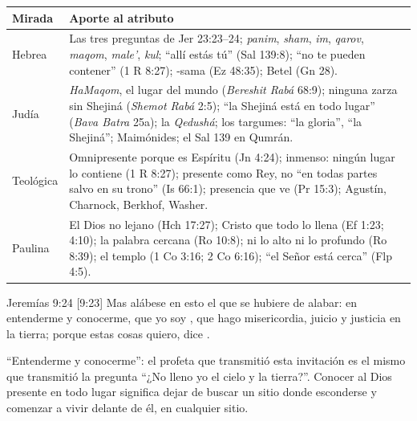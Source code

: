 \begin{center}\small\renewcommand{\arraystretch}{1.3}
\begin{tabular}{@{}L{3.0cm}L{11.4cm}@{}}
\toprule
\textbf{Mirada} & \textbf{Aporte al atributo} \\ \midrule
Hebrea & Las tres preguntas de Jer 23:23--24; \emph{panim}, \emph{sham}, \emph{im}, \emph{qarov}, \emph{maqom}, \emph{male'}, \emph{kul}; ``allí estás tú'' (Sal 139:8); ``no te pueden contener'' (1 R 8:27); \SENOR{}-sama (Ez 48:35); Betel (Gn 28). \\
Judía & \emph{HaMaqom}, el lugar del mundo (\emph{Bereshit Rabá} 68:9); ninguna zarza sin Shejiná (\emph{Shemot Rabá} 2:5); ``la Shejiná está en todo lugar'' (\emph{Bava Batra} 25a); la \emph{Qedushá}; los targumes: ``la gloria'', ``la Shejiná''; Maimónides; el Sal 139 en Qumrán. \\
Teológica & Omnipresente porque es Espíritu (Jn 4:24); inmenso: ningún lugar lo contiene (1 R 8:27); presente como Rey, no ``en todas partes salvo en su trono'' (Is 66:1); presencia que ve (Pr 15:3); Agustín, Charnock, Berkhof, Washer. \\
Paulina & El Dios no lejano (Hch 17:27); Cristo que todo lo llena (Ef 1:23; 4:10); la palabra cercana (Ro 10:8); ni lo alto ni lo profundo (Ro 8:39); el templo (1 Co 3:16; 2 Co 6:16); ``el Señor está cerca'' (Flp 4:5). \\
\bottomrule
\end{tabular}\end{center}

\begin{verso}{Jeremías 9:24 [9:23]}
Mas alábese en esto el que se hubiere de alabar: en entenderme y conocerme, que yo soy \SENOR{}, que hago misericordia, juicio y justicia en la tierra; porque estas cosas quiero, dice \SENOR{}.
\end{verso}

``Entenderme y conocerme'': el profeta que transmitió esta invitación es el mismo que transmitió la pregunta ``¿No lleno yo el cielo y la tierra?''. Conocer al Dios presente en todo lugar significa dejar de buscar un sitio donde esconderse y comenzar a vivir delante de él, en cualquier sitio.

